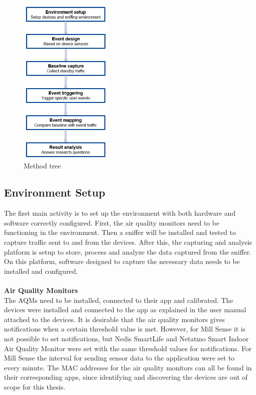 \begin{figure} [H]
    \centering
    \includegraphics[width=0.4\textwidth]{figures/MethodTree.png}
    \caption{Method tree}
    \label{fig:MethodTree}
\end{figure}
\subsection{Environment Setup}
The first main activity is to set up the environment with both hardware and software correctly configured. First, the air quality monitors need to be functioning in the environment. Then a sniffer will be installed and tested to capture traffic sent to and from the devices. After this, the capturing and analysis platform is setup to store, process and analyze the data captured from the sniffer. On this platform, software designed to capture the necessary data needs to be installed and configured.  
\\\\
\textbf{Air Quality Monitors}\\
The \gls{AQM}s need to be installed, connected to their app and calibrated. The devices were installed and connected to the app as explained in the user manual attached to the devices. It is desirable that the air quality monitors gives notifications when a certain threshold value is met. However, for Mill Sense it is not possible to set notifications, but Nedis SmartLife and Netatmo Smart Indoor Air Quality Monitor were set with the same threshold values for notifications. For Mill Sense the interval for sending sensor data to the application were set to every minute. The \gls{MAC} addresses for the air quality monitors can all be found in their corresponding apps, since identifying and discovering the devices are out of scope for this thesis. 

